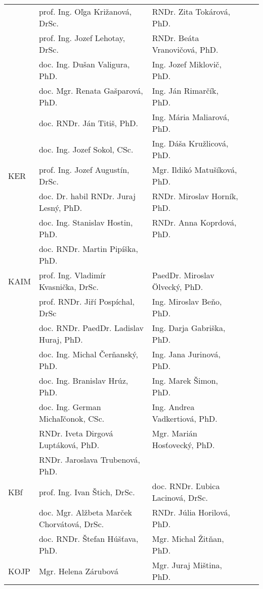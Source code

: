 \begin{table}
\begin{tabularx}{\textwidth}{lllll}
         & prof. Ing. Oľga Križanová, DrSc. & RNDr. Zita Tokárová, PhD. \\
         & prof. Ing. Jozef Lehotay, DrSc. & RNDr. Beáta Vranovičová, PhD. \\
         & doc. Ing. Dušan Valigura, PhD. & Ing. Jozef Miklovič, PhD. \\
         & doc. Mgr. Renata Gašparová, PhD. & Ing. Ján Rimarčík, PhD. \\
         & doc. RNDr. Ján Titiš, PhD. & Ing. Mária Maliarová, PhD. \\
         & doc. Ing. Jozef Sokol, CSc. & Ing. Dáša Kružlicová, PhD. \\ [2ex]
    KER  & prof. Ing. Jozef Augustín, DrSc. & Mgr. Ildikó Matušíková, PhD. \\
         & doc. Dr. habil RNDr. Juraj Lesný, PhD. & RNDr. Miroslav Horník, PhD. \\
         & doc. Ing. Stanislav Hostin, PhD. &  RNDr. Anna Koprdová, PhD.\\
         & doc. RNDr. Martin Pipíška, PhD. &  \\[2ex]
    KAIM & prof. Ing. Vladimír Kvasnička, DrSc. & PaedDr. Miroslav Ölvecký, PhD. \\
         & prof. RNDr. Jiří Pospíchal, DrSc & Ing. Miroslav Beňo, PhD. \\
         & doc. RNDr. PaedDr. Ladislav Huraj, PhD. & Ing. Darja Gabriška, PhD. \\
         & doc. Ing. Michal Čerňanský, PhD. & Ing. Jana Jurinová, PhD.  \\
         & doc. Ing. Branislav Hrúz, PhD. & Ing. Marek Šimon, PhD. \\
         & doc. Ing. German Michaľčonok, CSc. & Ing. Andrea Vadkertiová, PhD. \\
         & RNDr. Iveta Dirgová Luptáková, PhD. & Mgr. Marián Hosťovecký, PhD. \\
         & RNDr. Jaroslava Trubenová, PhD. &  \\[2ex]
  KBf  & prof. Ing. Ivan Štich, DrSc.  & doc. RNDr. Ľubica Lacinová, DrSc. \\
       & doc. Mgr. Alžbeta Marček Chorvátová, DrSc. & RNDr. Júlia Horilová, PhD. \\
       & doc. RNDr. Štefan Húšťava, PhD. & Mgr. Michal Žitňan, PhD. \\[2ex]
  KOJP & Mgr. Helena Zárubová & Mgr. Juraj Miština, PhD. \\[0.5ex]
  \bottomrule
\end{tabularx}
\end{table}

